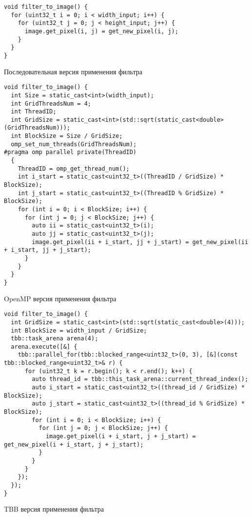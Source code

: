 \documentclass[12pt]{article}
\newenvironment{longlisting}{\captionsetup{type=listing, name=Приложение}}{}
\begin{document}
\begin{longlisting}
\begin{verbatim}
void filter_to_image() {
  for (uint32_t i = 0; i < width_input; i++) {
    for (uint32_t j = 0; j < height_input; j++) {
      image.get_pixel(i, j) = get_new_pixel(i, j);
    }
  }
}
\end{verbatim}
\caption{Последовательная версия применения фильтра}
\label{lst:seq}
\end{longlisting}


\begin{longlisting}
\begin{verbatim}
void filter_to_image() {
  int Size = static_cast<int>(width_input);
  int GridThreadsNum = 4;
  int ThreadID;
  int GridSize = static_cast<int>(std::sqrt(static_cast<double>(GridThreadsNum)));
  int BlockSize = Size / GridSize;
  omp_set_num_threads(GridThreadsNum);
#pragma omp parallel private(ThreadID)
  {
    ThreadID = omp_get_thread_num();
    int i_start = static_cast<uint32_t>((ThreadID / GridSize) * BlockSize);
    int j_start = static_cast<uint32_t>((ThreadID % GridSize) * BlockSize);
    for (int i = 0; i < BlockSize; i++) {
      for (int j = 0; j < BlockSize; j++) {
        auto ii = static_cast<uint32_t>(i);
        auto jj = static_cast<uint32_t>(j);
        image.get_pixel(ii + i_start, jj + j_start) = get_new_pixel(ii + i_start, jj + j_start);
      }
    }
  }
}
\end{verbatim}
\caption{OpenMP версия применения фильтра}
\label{lst:omp}
\end{longlisting}


\begin{longlisting}
\begin{verbatim}
void filter_to_image() {
  int GridSize = static_cast<int>(std::sqrt(static_cast<double>(4)));
  int BlockSize = width_input / GridSize;
  tbb::task_arena arena(4);
  arena.execute([&] {
    tbb::parallel_for(tbb::blocked_range<uint32_t>(0, 3), [&](const tbb::blocked_range<uint32_t>& r) {
      for (uint32_t k = r.begin(); k < r.end(); k++) {
        auto thread_id = tbb::this_task_arena::current_thread_index();
        auto i_start = static_cast<uint32_t>((thread_id / GridSize) * BlockSize);
        auto j_start = static_cast<uint32_t>((thread_id % GridSize) * BlockSize);
        for (int i = 0; i < BlockSize; i++) {
          for (int j = 0; j < BlockSize; j++) {
            image.get_pixel(i + i_start, j + j_start) = get_new_pixel(i + i_start, j + j_start);
          }
        }
      }
    });
  });
}
\end{verbatim}
\caption{TBB версия применения фильтра}
\label{lst:tbb}
\end{longlisting}
\end{document}
